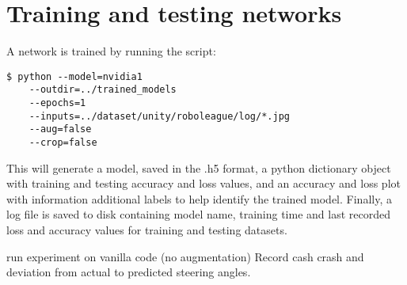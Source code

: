 \section{Training and testing networks}
A network is trained by running the script:
\begin{verbatim}
$ python --model=nvidia1
    --outdir=../trained_models
    --epochs=1
    --inputs=../dataset/unity/roboleague/log/*.jpg
    --aug=false
    --crop=false    
\end{verbatim}
This will generate a model, saved in the .h5 format, a python dictionary object with training and testing accuracy and loss values, and an accuracy and loss plot with information additional labels to help identify the trained model. Finally, a log file is saved to disk containing model name, training time and last recorded loss and accuracy values for training and testing datasets.

run experiment on vanilla code (no augmentation)
Record cash crash and deviation from actual to predicted steering angles.

